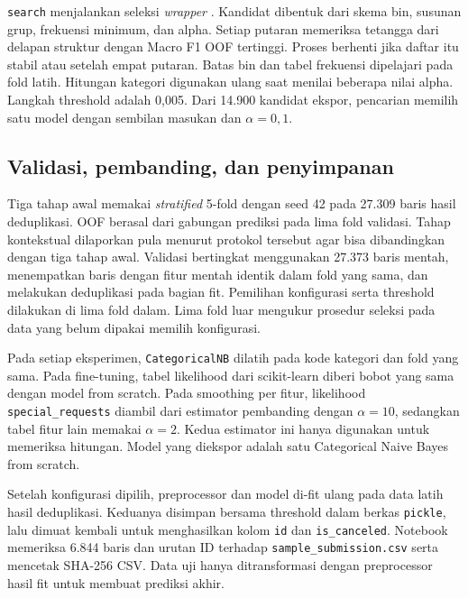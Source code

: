 \texttt{search} menjalankan seleksi \emph{wrapper} \cite{ref:kohavi_nb}. Kandidat dibentuk dari skema bin, susunan grup, frekuensi minimum, dan alpha. Setiap putaran memeriksa tetangga dari delapan struktur dengan Macro F1 OOF tertinggi. Proses berhenti jika daftar itu stabil atau setelah empat putaran. Batas bin dan tabel frekuensi dipelajari pada fold latih. Hitungan kategori digunakan ulang saat menilai beberapa nilai alpha. Langkah threshold adalah 0,005. Dari 14.900 kandidat ekspor, pencarian memilih satu model dengan sembilan masukan dan \(\alpha=0{,}1\).

\subsection{Validasi, pembanding, dan penyimpanan}
Tiga tahap awal memakai \emph{stratified} 5-fold dengan seed 42 pada 27.309 baris hasil deduplikasi. OOF berasal dari gabungan prediksi pada lima fold validasi. Tahap kontekstual dilaporkan pula menurut protokol tersebut agar bisa dibandingkan dengan tiga tahap awal. Validasi bertingkat menggunakan 27.373 baris mentah, menempatkan baris dengan fitur mentah identik dalam fold yang sama, dan melakukan deduplikasi pada bagian fit. Pemilihan konfigurasi serta threshold dilakukan di lima fold dalam. Lima fold luar mengukur prosedur seleksi pada data yang belum dipakai memilih konfigurasi.

Pada setiap eksperimen, \texttt{CategoricalNB} dilatih pada kode kategori dan fold yang sama. Pada fine-tuning, tabel likelihood dari scikit-learn diberi bobot yang sama dengan model from scratch. Pada smoothing per fitur, likelihood \texttt{special\_requests} diambil dari estimator pembanding dengan \(\alpha=10\), sedangkan tabel fitur lain memakai \(\alpha=2\). Kedua estimator ini hanya digunakan untuk memeriksa hitungan. Model yang diekspor adalah satu Categorical Naive Bayes from scratch.

Setelah konfigurasi dipilih, preprocessor dan model di-fit ulang pada data latih hasil deduplikasi. Keduanya disimpan bersama threshold dalam berkas \texttt{pickle}, lalu dimuat kembali untuk menghasilkan kolom \texttt{id} dan \texttt{is\_canceled}. Notebook memeriksa 6.844 baris dan urutan ID terhadap \texttt{sample\_submission.csv} serta mencetak SHA-256 CSV. Data uji hanya ditransformasi dengan preprocessor hasil fit untuk membuat prediksi akhir.
